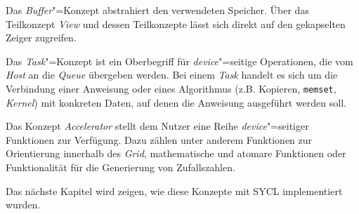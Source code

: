 Das \textit{Buffer}"=Konzept abstrahiert den verwendeten Speicher. Über das
Teilkonzept \textit{View} und dessen Teilkonzepte lässt sich direkt auf den
gekapselten Zeiger zugreifen.

Das \textit{Task}"=Konzept ist ein Oberbegriff für \textit{device}"=seitige
Operationen, die vom \textit{Host} an die \textit{Queue} übergeben werden. Bei
einem \textit{Task} handelt es sich um die Verbindung einer Anweisung oder eines
Algorithmus (z.B. Kopieren, \texttt{memset}, \textit{Kernel}) mit konkreten
Daten, auf denen die Anweisung ausgeführt werden soll.

Das Konzept \textit{Accelerator} stellt dem Nutzer eine Reihe
\textit{device}"=seitiger Funktionen zur Verfügung. Dazu zählen unter anderem
Funktionen zur Orientierung innerhalb des \textit{Grid}, mathematische und
atomare Funktionen oder Funktionalität für die Generierung von Zufallszahlen.

Das nächste Kapitel wird zeigen, wie diese Konzepte mit SYCL implementiert
wurden.

